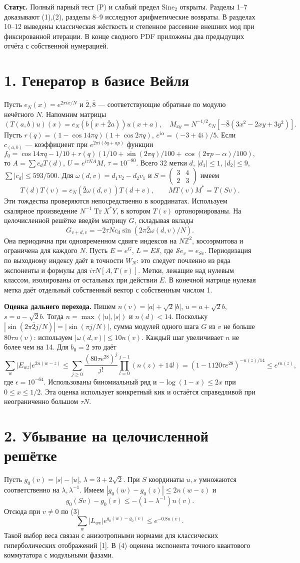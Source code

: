\documentclass[11pt,a4paper]{article}
\newcommand{\Tr}{\operatorname{Tr}}
\newcommand{\Z}{\mathbb Z}
\newcommand{\si}{\mathrm{Sine}_2}
\newcommand{\sect}[1]{\section*{\sffamily\color{ink}#1}}
\newcommand{\subt}[1]{\par\medskip\noindent\textbf{#1.}\quad}
\begin{document}
\subt{Статус} Полный парный тест (P) и слабый предел $\si$ открыты. Разделы 1--7 доказывают (1),(2), разделы 8--9 исследуют арифметические возвраты. В разделах 10--12 выведены классическая жёсткость и степенное рассеяние внешних мод при фиксированной итерации. В конце сводного PDF приложены два предыдущих отчёта с собственной нумерацией.
\newpage
\sect{1. Генератор в базисе Вейля}
Пусть $e_N(x)=e^{2\pi i x/N}$ и $\bar2,\bar8$ --- соответствующие обратные по модулю нечётного $N$. Напомним матрицы
\[
 (T(a,b)u)(x)=e_N(b(x+\bar2a))u(x+a),\quad
 M_{xy}=N^{-1/2}e_N[-\bar8(3x^2-2xy+3y^2)].
\]
Пусть $r(q)=(1-\cos14\pi q)(1+\cos2\pi q)$, $e^{i\alpha}=(-3+4i)/5$. Если $c_{(a,b)}$ --- коэффициент при $e^{2\pi i(bq+ap)}$ функции
\[
 f_0=\cos14\pi q-1/10+r(q)(1/10+\sin(2\pi q)/100+\cos(2\pi p-\alpha)/100),
\]
то $A=\sum c_dT(d)$, $U=e^{i\tau N A}M$, $\tau=10^{-80}$. Всего 32 метки $d$, $|d_1|\le1$, $|d_2|\le9$, $\sum|c_d|\le593/500$. Для $\omega(d,v)=d_1v_2-d_2v_1$ и $S=\left(\begin{smallmatrix}3&4\\2&3\end{smallmatrix}\right)$ имеем
\[
 T(d)T(v)=e_N(\bar2\omega(d,v))T(d+v),\qquad MT(v)M^*=T(Sv).
\]
Эти тождества проверяются непосредственно в координатах. Используем скалярное произведение $N^{-1}\Tr X^*Y$, в котором $T(v)$ ортонормированы. На целочисленной решётке введём матрицу $G$, складывая вклады
\[
 G_{v+d,v}=-2\tau N c_d\sin(2\pi\bar2\omega(d,v)/N).
\]
Она периодична при одновременном сдвиге индексов на $N\Z^2$, косоэрмитова и ограничена для каждого $N$. Пусть $E=e^G$, $L=E\mathcal S$, где $\mathcal S e_v=e_{Sv}$. Периодизация по выходному индексу даёт в точности $W_N$: это следует почленно из ряда экспоненты и формулы для $i\tau N[A,T(v)]$. Метки, лежащие над нулевым классом, изолированы от остальных при действии $E$. В конечной матрице нулевая метка даёт отдельный собственный вектор с собственным числом 1.

\subt{Оценка дальнего перехода} Пишем $n(v)=|a|+\sqrt2|b|$, $u=a+\sqrt2 b$, $s=a-\sqrt2 b$. Тогда $n=\max(|u|,|s|)$ и $n(d)<14$. Поскольку $|\sin(2\pi\bar2 j/N)|=|\sin(\pi j/N)|$, сумма модулей одного шага $G$ из $v$ не больше $80\tau n(v)$: используем $|\omega(d,v)|\le10n(v)$. Каждый шаг увеличивает $n$ не более чем на 14. Для $b_0=2$ это даёт
\[
 \sum_w |E_{wz}|e^{2n(w-z)}
 \le \sum_{j\ge0}\frac{(80\tau e^{28})^j}{j!}
               \prod_{l=0}^{j-1}(n(z)+14l)
 =(1-1120\tau e^{28})^{-n(z)/14}\le e^{\epsilon n(z)},                \tag{3}
\]
где $\epsilon=10^{-64}$. Использованы биномиальный ряд и $-\log(1-x)\le2x$ при $0\le x\le1/2$. Эта оценка использует конкретный кик и остаётся справедливой при неограниченно большом $\tau N$.
\newpage
\sect{2. Убывание на целочисленной решётке}
Пусть $g_0(v)=|s|-|u|$, $\lambda=3+2\sqrt2$. При $S$ координаты $u,s$ умножаются соответственно на $\lambda,\lambda^{-1}$. Имеем $|g_0(w)-g_0(z)|\le2n(w-z)$ и
\[
 g_0(Sv)-g_0(v)\le-(1-\lambda^{-1})n(v).
\]
Отсюда при $v\ne0$ по (3)
\[
 \sum_w |L_{wv}|e^{g_0(w)-g_0(v)}\le e^{-0.8 n(v)}.                   \tag{4}
\]
Такой выбор веса связан с анизотропными нормами для классических гиперболических отображений [1]. В (4) оценена экспонента точного квантового коммутатора с модульными фазами.
\end{document}
